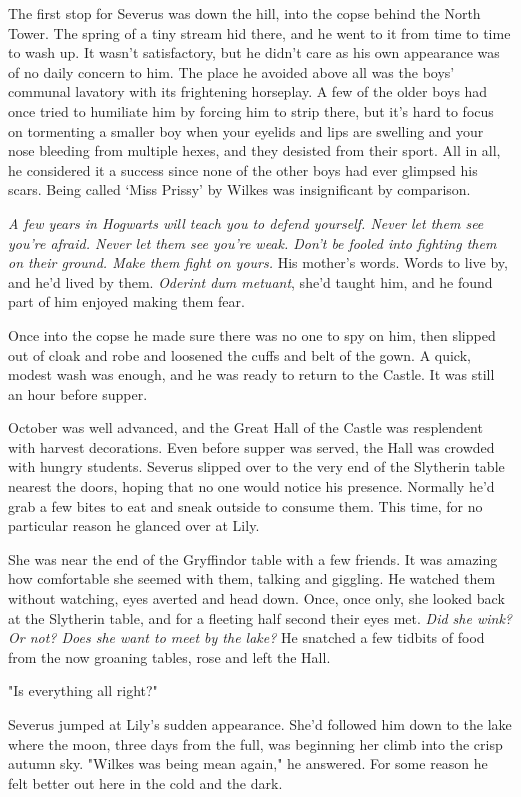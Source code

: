 The first stop for Severus was down the hill, into the copse behind the North Tower. The spring of a tiny stream hid there, and he went to it from time to time to wash up. It wasn't satisfactory, but he didn't care as his own appearance was of no daily concern to him. The place he avoided above all was the boys' communal lavatory with its frightening horseplay. A few of the older boys had once tried to humiliate him by forcing him to strip there, but it's hard to focus on tormenting a smaller boy when your eyelids and lips are swelling and your nose bleeding from multiple hexes, and they desisted from their sport. All in all, he considered it a success since none of the other boys had ever glimpsed his scars. Being called `Miss Prissy' by Wilkes was insignificant by comparison.

\emph{A few years in Hogwarts will teach you to defend yourself. Never let them see you're afraid. Never let them see you're weak. Don't be fooled into fighting them on their ground. Make them fight on yours.} His mother's words. Words to live by, and he'd lived by them. \emph{Oderint dum metuant}, she'd taught him, and he found part of him enjoyed making them fear.

Once into the copse he made sure there was no one to spy on him, then slipped out of cloak and robe and loosened the cuffs and belt of the gown. A quick, modest wash was enough, and he was ready to return to the Castle. It was still an hour before supper.

October was well advanced, and the Great Hall of the Castle was resplendent with harvest decorations. Even before supper was served, the Hall was crowded with hungry students. Severus slipped over to the very end of the Slytherin table nearest the doors, hoping that no one would notice his presence. Normally he'd grab a few bites to eat and sneak outside to consume them. This time, for no particular reason he glanced over at Lily.

She was near the end of the Gryffindor table with a few friends. It was amazing how comfortable she seemed with them, talking and giggling. He watched them without watching, eyes averted and head down. Once, once only, she looked back at the Slytherin table, and for a fleeting half second their eyes met. \emph{Did she wink? Or not? Does she want to meet by the lake?} He snatched a few tidbits of food from the now groaning tables, rose and left the Hall.

"Is everything all right?"

Severus jumped at Lily's sudden appearance. She'd followed him down to the lake where the moon, three days from the full, was beginning her climb into the crisp autumn sky. "Wilkes was being mean again," he answered. For some reason he felt better out here in the cold and the dark.

